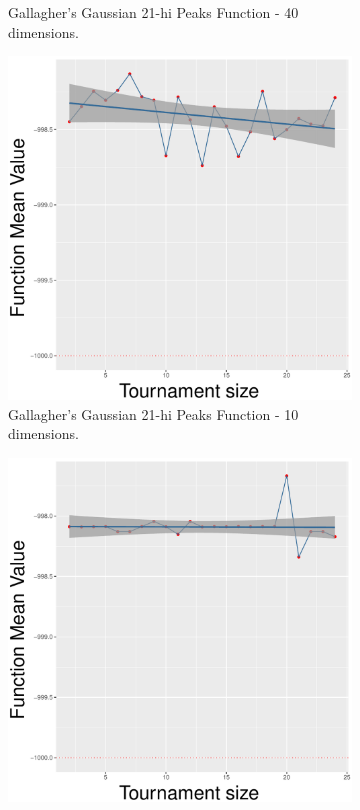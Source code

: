 \begin{figure}[!t]
\begin{subfigure}[b]{0.33\textwidth}
		\caption{Gallagher's Gaussian 21-hi Peaks Function - 40 dimensions.}
	\end{subfigure}
	\caption{Uniform crossover - ($\lambda, \lambda$) scheme.}
	\label{uniform-22-a}
	\begin{subfigure}[b]{0.33\textwidth}
		\centering
		\includegraphics[width=\textwidth]{img/2n2n-10D/multimodal_2n2n_22_dim_10.pdf}
		\caption{Gallagher's Gaussian 21-hi Peaks Function - 10 dimensions.}
	\end{subfigure}
	\begin{subfigure}[b]{0.33\textwidth}
		\centering
		\includegraphics[width=\textwidth]{img/2n2n-20D/multimodal_2n2n_22_dim_20.pdf}

\end{subfigure}
\end{figure}
